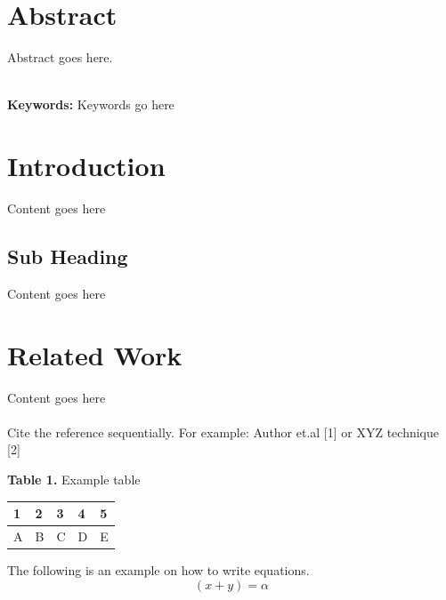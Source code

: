 \documentclass[12pt,twoside]{article}
\begin{document}
\begin{onehalfspace}
\section*{Abstract}
Abstract goes here. 

\vspace{5pt}\\
\textbf{\fontsize{12}{12}\selectfont Keywords:} Keywords go here

\section{{Introduction}}
{Content goes here}
\vspace{10pt}
\subsection{Sub Heading}
{Content goes here}
\vspace{10pt}
\section{Related Work}
{Content goes here}\\
\\
{Cite the reference sequentially.  For example: Author et.al [1] or XYZ technique [2]}
\vspace{10pt}

\begin{center}
\textbf{Table 1.} Example table\\\vspace{5pt}
\begin{table}[h]
\begin{center}
\begin{tabular}{|M{2cm}|M{2cm}|M{2cm}|M{2cm}|M{2cm}|}
\hline
\textbf{1} & \textbf{2} & \textbf{3} & \textbf{4} & \textbf{5} \\
\hline
\centering\centering
A & B & C & D & E  \\\hline
\end{tabular}
\end{center}
\end{table}
\end{center}

The following is an example on how to write equations.\\
\begin{equation}
		(x + y) = \alpha
\end{equation}


\end{onehalfspace}
\end{document}
